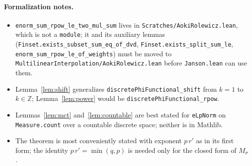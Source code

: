 \documentclass[11pt]{article}
\theoremstyle{definition}
\theoremstyle{remark}
\newcommand{\Z}{\mathbb Z}
\begin{document}
\paragraph{Formalization notes.}
\begin{itemize}
  \item \texttt{enorm\_sum\_rpow\_le\_two\_mul\_sum} lives in \texttt{Scratches/AokiRolewicz.lean},
    which is not a \texttt{module}; it and its auxiliary lemmas
    (\texttt{Finset.exists\_subset\_sum\_eq\_of\_dvd}, \texttt{Finset.exists\_split\_sum\_le},
    \texttt{enorm\_sum\_rpow\_le\_of\_weights}) must be moved to
    \texttt{MultilinearInterpolation/AokiRolewicz.lean} before \texttt{Janson.lean} can use them.
  \item Lemma~\ref{lem:shift} generalizes \texttt{discretePhiFunctional\_shift} from \(k=1\) to
    \(k \in \Z\); Lemma~\ref{lem:power} would be \texttt{discretePhiFunctional\_rpow}.
  \item Lemmas~\ref{lem:mct} and~\ref{lem:countable} are best stated for \texttt{eLpNorm} on
    \texttt{Measure.count} over a countable discrete space; neither is in Mathlib.
  \item The theorem is most conveniently stated with exponent \(p\,r'\) as in its first form;
    the identity \(p\,r' = \min(q,p)\) is needed only for the closed form of \(M_\sigma\).
\end{itemize}
\end{document}
